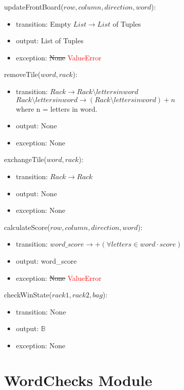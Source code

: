 \documentclass[12pt]{article}
\begin{document}
\noindent updateFrontBoard($row, column, direction, word$):
\begin{itemize}
\item transition: Empty $List \rightarrow List$ of Tuples
\item output: List of Tuples
\item exception: \sout{None} \textcolor{red}{ValueError}
\end{itemize}

\noindent removeTile($word, rack$):
\begin{itemize}
\item transition: $Rack \rightarrow Rack \setminus {letters in word}$ \\
$Rack \setminus {letters in word} \rightarrow (Rack \setminus {letters in word}) + n$\\
where n = letters in word.
\item output: None
\item exception: None
\end{itemize}

\noindent exchangeTile($word, rack$):
\begin{itemize}
\item transition: $Rack \rightarrow Rack$
\item output: None
\item exception: None
\end{itemize}

\noindent calculateScore($row, column, direction, word$):
\begin{itemize}
\item transition: $word\_score \rightarrow +(\forall letters \in word \cdot score)$
\item output: word\_score
\item exception: \sout{None} \textcolor{red}{ValueError}
\end{itemize}

\noindent checkWinState($rack1, rack2, bag$):
\begin{itemize}
\item transition: None
\item output: $\mathbb{B}$
\item exception: None
\end{itemize}

\newpage

\section* {WordChecks Module}
\end{document}
